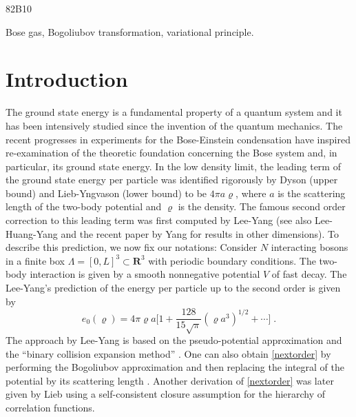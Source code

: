 \documentclass[11pt]{article}
\numberwithin{equation}{section}
\newcommand{\beq}{\begin{equation}}
\newcommand{\eeq}{\end{equation}}
\renewcommand\rho\varrho
\theoremstyle{definition}
\begin{document}
\bigskip

 82B10

\bigskip

 Bose gas, Bogoliubov transformation, variational principle.





%

\newpage

\section{Introduction}

The ground state energy  is a fundamental property of a quantum system and 
it has been intensively studied since the invention of the quantum mechanics. 
The recent progresses  in experiments for the 
 Bose-Einstein condensation have inspired re-examination of the theoretic foundation  
 concerning the Bose system and, in particular, its ground state energy.    
 In the low density limit, the leading term of the ground state energy per particle 
 was identified  rigorously by   Dyson (upper
bound) \cite{D} and Lieb-Yngvason (lower bound) \cite{LY} to be $4\pi a \varrho$, 
where $a$ is the scattering length of the two-body
potential and $\varrho$ is the density. The famous second order
correction to this leading term was first computed by Lee-Yang \cite{LYang} (see also Lee-Huang-Yang \cite{LHY} and  the recent paper 
by Yang \cite{Y} for results in other dimensions). To describe this prediction, 
we now fix our notations:  Consider $N$ interacting bosons in a finite box $\Lambda= [0,L]^3\subset \mathbf R^3$
with periodic boundary conditions.  
The two-body interaction  is given by a smooth nonnegative potential $V$ 
of fast decay. 
The Lee-Yang's prediction of the energy per particle 
up to the second order  is given by
\beq\label{nextorder}
e_0(\rho)  = 4\pi\varrho a \Big [1+
\frac{128}{15\sqrt{\pi}}( \varrho a^3)^{1/2}
 + \cdots  \Big ] \; .
\eeq
The approach by Lee-Yang \cite{LYang} is based on the pseudo-potential approximation \cite{HY, LHY}
and the ``binary collision expansion method'' \cite{LHY}. One can also obtain \eqref{nextorder} by performing the 
Bogoliubov \cite{B} approximation and then replacing the integral of the potential 
by its scattering length \cite{Landau}.  Another derivation of \eqref{nextorder} 
was later given  by Lieb \cite{L} using 
a self-consistent closure assumption  for the hierarchy of correlation functions.
\end{document}
